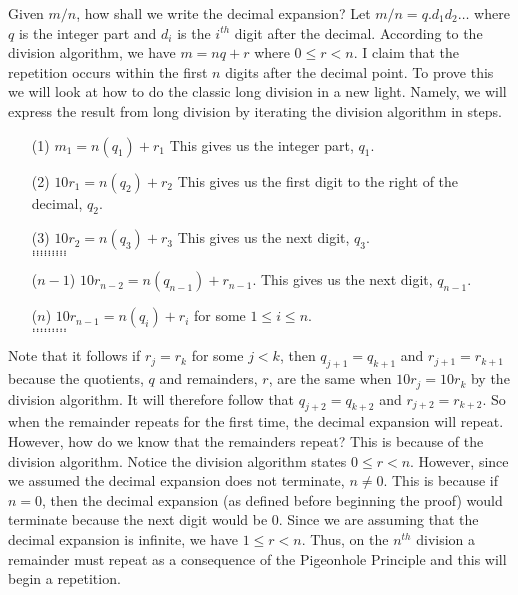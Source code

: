 \documentclass[12pt]{article}
\begin{document}
\begin{enumerate}
Given $m/n$, how shall we write the decimal expansion? Let $m/n = q \textbf{.} d_{1} d_{2} \ldots $ where $q$ is the integer part and $d_{i}$ is the $i^{th}$ digit after the decimal. According to the division algorithm, we have $m=nq+r$ where  $0 \leq r < n$. I claim that the repetition occurs within the first $n$ digits after the decimal point. To prove this we will look at how to do the classic long division in a new light. Namely, we will express the result from long division by  iterating the division algorithm in steps. \\ 
\begin{itemize}
\item [(1)] $m_{1} = n(q_{1}) + r_{1}$ This gives us the integer part, $q_{1}$. \\
\item [(2)] $10r_{1} = n(q_{2}) + r_{2}$ This gives us the first digit to the right of the decimal, $q_{2}$. \\
\item [(3)] $10r_{2} = n(q_{3}) + r_{3}$ This gives us the next digit, $q_{3}$. \\
\hspace{5mm} $\ldots\ldots\ldots$  \\
\hspace{5mm} $\ldots\ldots\ldots$  \\
\hspace{5mm} $\ldots\ldots\ldots$  
\item [($n-1$)] $10r_{n-2} = n(q_{n-1}) + r_{n-1}$. This gives us the next digit, $q_{n-1}$. \\
\item [($n$)] $10r_{n-1} = n(q_{i}) + r_{i}$ for some $1 \leq i \leq n$. \\
\hspace{5mm} $\ldots\ldots\ldots$ \\
\hspace{5mm} $\ldots\ldots\ldots$
\end{itemize}


Note that it follows if $r_{j}=r_{k}$ for some $j<k$, then $q_{j+1}=q_{k+1}$ and $r_{j+1}=r_{k+1}$ because the quotients, $q$ and remainders, $r$, are the same when $10r_{j}=10r_{k}$ by the division algorithm. It will therefore follow that $q_{j+2}=q_{k+2}$ and $r_{j+2}=r_{k+2}$. So when the remainder repeats for the first time, the decimal expansion will repeat. However, how do we know that the remainders repeat? This is because of the division algorithm. Notice the division algorithm states $0 \leq r < n$. However, since we assumed the decimal expansion does not terminate, $n \neq 0$. This is because if $n=0$, then the decimal expansion (as defined before beginning the proof) would terminate because the next digit would be 0. Since we are assuming that the decimal expansion is infinite, we have $1 \leq r < n$. Thus, on the $n^{th}$ division a remainder must repeat as a consequence of the Pigeonhole Principle and this will begin a repetition. \\ \\


\end{enumerate}
\end{document}
